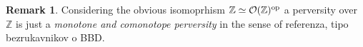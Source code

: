 \documentclass{article}
\newtheorem{prop}[thm]{Proposition}
\theoremstyle{definition}
\newtheorem{rem}[thm]{Remark}
\newcommand{\Z}{\mathbb{Z}}
\newcommand{\Oo}{\mathcal{O}}
\newcommand{\op}{\textnormal{op}}
\begin{document}
\begin{rem}
Considering the obvious isomoprhism $\Z \simeq \Oo(\Z)^\op$ a perversity over $\mathbb{Z}$ is just a \textit{monotone and comonotope perversity} in the sense of {\color{red} referenza, tipo bezrukavnikov o BBD}. 
\end{rem}
%
%
\end{document}
